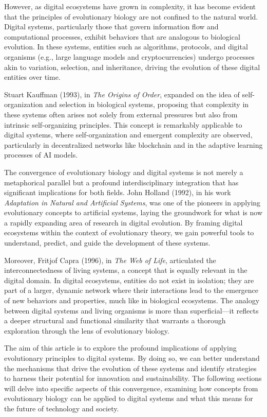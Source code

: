 \documentclass[12pt,twoside]{article}
\begin{document}
However, as digital ecosystems have grown in complexity, it has become evident that the principles of evolutionary biology are not confined to the natural world. Digital systems, particularly those that govern information flow and computational processes, exhibit behaviors that are analogous to biological evolution. In these systems, entities such as algorithms, protocols, and digital organisms (e.g., large language models and cryptocurrencies) undergo processes akin to variation, selection, and inheritance, driving the evolution of these digital entities over time.

Stuart Kauffman (1993), in \textit{The Origins of Order}, expanded on the idea of self-organization and selection in biological systems, proposing that complexity in these systems often arises not solely from external pressures but also from intrinsic self-organizing principles. This concept is remarkably applicable to digital systems, where self-organization and emergent complexity are observed, particularly in decentralized networks like blockchain and in the adaptive learning processes of AI models.

The convergence of evolutionary biology and digital systems is not merely a metaphorical parallel but a profound interdisciplinary integration that has significant implications for both fields. John Holland (1992), in his work \textit{Adaptation in Natural and Artificial Systems}, was one of the pioneers in applying evolutionary concepts to artificial systems, laying the groundwork for what is now a rapidly expanding area of research in digital evolution. By framing digital ecosystems within the context of evolutionary theory, we gain powerful tools to understand, predict, and guide the development of these systems.

Moreover, Fritjof Capra (1996), in \textit{The Web of Life}, articulated the interconnectedness of living systems, a concept that is equally relevant in the digital domain. In digital ecosystems, entities do not exist in isolation; they are part of a larger, dynamic network where their interactions lead to the emergence of new behaviors and properties, much like in biological ecosystems. The analogy between digital systems and living organisms is more than superficial—it reflects a deeper structural and functional similarity that warrants a thorough exploration through the lens of evolutionary biology.

The aim of this article is to explore the profound implications of applying evolutionary principles to digital systems. By doing so, we can better understand the mechanisms that drive the evolution of these systems and identify strategies to harness their potential for innovation and sustainability. The following sections will delve into specific aspects of this convergence, examining how concepts from evolutionary biology can be applied to digital systems and what this means for the future of technology and society.
\end{document}
